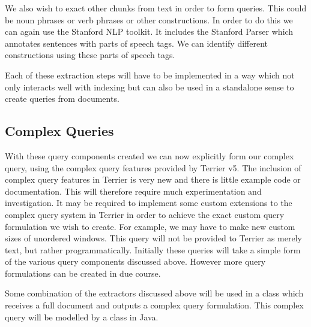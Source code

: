 \documentclass{mprop}
\begin{document}
We also wish to exact other chunks from text in order to form queries.
This could be noun phrases or verb phrases or other constructions.
In order to do this we can again use the Stanford NLP toolkit.
It includes the Stanford Parser which annotates sentences with parts of speech tags.
We can identify different constructions using these parts of speech tags.

Each of these extraction steps will have to be implemented in a way which not only interacts well with indexing but can also be used in a standalone sense to create queries from documents.


\subsection{Complex Queries}
With these query components created we can now explicitly form our complex query, using the complex query features provided by Terrier v5. 
The inclusion of complex query features in Terrier is very new and there is little example code or documentation.
This will therefore require much experimentation and investigation.
It may be required to implement some  custom extensions to the complex query system in Terrier in order to achieve the exact custom query formulation we wish to create.
For example, we may have to make new custom sizes of unordered windows. 
This query will not be provided to Terrier as merely text, but rather programmatically. 
Initially these queries will take a simple form of the various query components discussed above. 
However more query formulations can be created in due course.

Some combination of the extractors discussed above will be used in a class which receives a full document and outputs a complex query formulation.
This complex query will be modelled by a class in Java.

\end{document}
